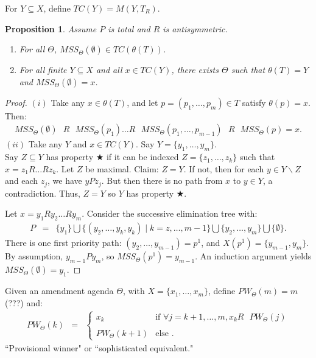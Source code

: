 \documentclass[12pt]{article}
\newtheorem{propo}{Proposition}[section]
\newcommand{\n}{\noindent}
\newcommand{\s}{\vspace{5mm}}
\begin{document}
\s
\n For $Y\subseteq X$, define $TC(Y)=M(Y,T_R)$.
\begin{propo}  Assume $P$ is total and $R$ is antisymmetric.
\begin{enumerate}
\item For all $\Theta$, $MSS_{\Theta}(\emptyset)\in TC(\theta(T))$.
\item For all finite $Y\subseteq X$ and all $x\in TC(Y)$, there exists $\Theta$ such that $\theta(T)=Y$ and $MSS_{\Theta}(\emptyset)=x$.
\end{enumerate}
\end{propo}
\begin{proof}  $(i)$ Take any $x\in\theta(T)$, and let $p=(p_1,\hdots,p_m)\in T$ satisfy $\theta(p)=x$.  Then:
\begin{eqnarray*}
MSS_{\Theta}(\emptyset)\mbox{ }R\mbox{ }MSS_{\Theta}(p_1)\hdots R\mbox{ }MSS_{\Theta}(p_1,\hdots,p_{m-1})\mbox{ }R\mbox{ }MSS_{\Theta}(p)=x.
\end{eqnarray*}  $(ii)$  Take any $Y$ and $x\in TC(Y)$.  Say $Y=\{y_1,\hdots,y_m\}$.\\

\n Say $Z\subseteq Y$ has property $\bigstar$ if it can be indexed $Z=\{z_1,\hdots,z_k\}$ such that $x=z_1R\hdots Rz_k$.  Let $Z$ be maximal.  Claim: $Z=Y$.  If not, then for each $y\in Y\backslash Z$ and each $z_j$, we have $yPz_j$.  But then there is no path from $x$ to $y\in Y$, a contradiction.  Thus, $Z=Y$ so $Y$ has property $\bigstar$.

\s
\n  Let $x=y_1Ry_2\hdots Ry_m$.  Consider the successive elimination tree with:
\begin{eqnarray*}
P&=&\{y_1\}\bigcup\{(y_2,\hdots,y_k,y_k)\mid k=z,\hdots,m-1\}\bigcup\{y_2,\hdots,y_m\}\bigcup\{\emptyset\}.
\end{eqnarray*}There is one first priority path: $(y_2,\hdots,y_{m-1})=p^1$, and $X(p^1)=\{y_{m-1},y_m\}$.  By assumption, $y_{m-1}Py_m$, so $MSS_{\Theta}(p^1)=y_{m-1}$.  An induction argument yields $MSS_{\Theta}(\emptyset)=y_1$.  
\end{proof}

\s
\n  Given an amendment agenda $\Theta$, with $X=\{x_1,\hdots,x_m\}$, define $PW_{\Theta}(m)=m$ (???) and:
\begin{eqnarray*}
PW_{\Theta}(k)&=&\left\{\begin{array}{cl}
x_k&\mbox{if }\forall j=k+1,\hdots,m, x_kR\mbox{ }PW_{\Theta}(j)\\
&\\
PW_{\Theta}(k+1)&\mbox{else }.
\end{array}\right.
\end{eqnarray*}  ``Provisional winner" or ``sophisticated equivalent."
\end{document}
